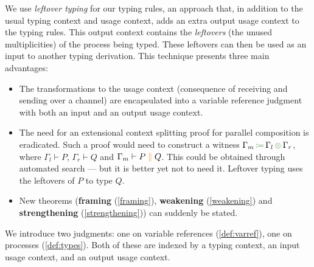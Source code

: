 \documentclass[a4paper,UKenglish,cleveref,autoref,thm-restate,authorcolumns]{lipics-v2019}
\theoremstyle{definition}
\newcommand{\constr}[1]{\textcolor{BurntOrange}{\operatorname{#1}}}
\newcommand{\func}[1]{\textcolor{OliveGreen}{\operatorname{#1}}}
\newcommand{\comp}[2]{#1 \; \constr{\parallel} \; #2}
\newcommand{\opctx}[3]{#1 \, \func{\coloneqq} \, #2 \, \func{\otimes} \, #3}
\begin{document}
We use \emph{leftover typing} \cite{Allais2018a} for our typing rules, an approach that, in addition to the usual typing context and usage context, adds an extra output usage context to the typing rules.
This output context contains the \emph{leftovers} (the unused multiplicities) of the process being typed.
These leftovers can then be used as an input to another typing derivation.
This technique presents three main advantages:
\begin{itemize}
  \item
    The transformations to the usage context (consequence of receiving and sending over a channel) are encapsulated into a variable reference judgment with both an input and an output usage context.
  \item
    The need for an extensional context splitting proof for parallel composition is eradicated.
    Such a proof would need to construct a witness $\opctx{\Gamma_m}{\Gamma_l}{\Gamma_r}$, where $\Gamma_l \vdash P$, $\Gamma_r \vdash Q$ and $\Gamma_m \vdash \comp{P}{Q}$.
    This could be obtained through automated search --- but it is better yet not to need it.
    Leftover typing uses the leftovers of $P$ to type $Q$.
  \item
    New theorems (\textbf{framing} (\autoref{framing}), \textbf{weakening} (\autoref{weakening}) and \textbf{strengthening} (\autoref{strengthening})) can suddenly be stated.
\end{itemize}
  
We introduce two judgments: one on variable references (\autoref{def:varref}), one on processes (\autoref{def:types}).
Both of these are indexed by a typing context, an input usage context, and an output usage context.
\end{document}
